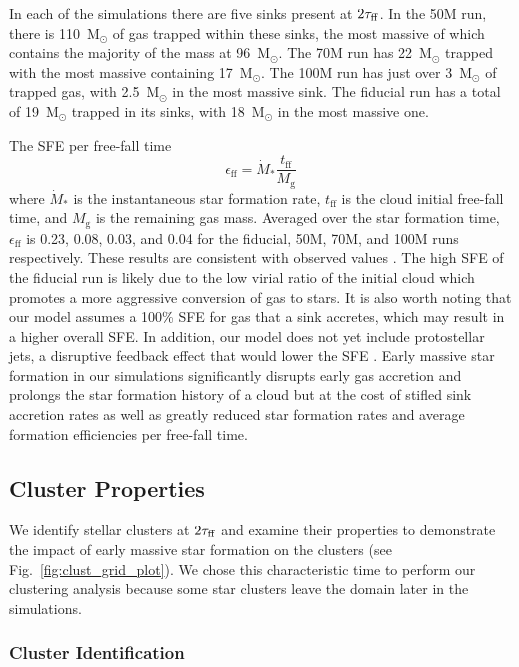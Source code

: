 \documentclass[twoside]{drexel-thesis}
\begin{document}
\begin{thesis}
In each of the simulations there are five sinks present at $2\tau_{\rm ff}$. In the 50M run, there is 110~M$_\odot$ of gas trapped within these sinks, the most massive of which contains the majority of the mass at 96~M$_\odot$. The 70M run has 22~M$_\odot$ trapped with the most massive containing 17~M$_\odot$. The 100M run has just over 3~M$_\odot$ of trapped gas, with 2.5~M$_\odot$ in the most massive sink. The fiducial run has a total of 19~M$_\odot$ trapped in its sinks, with 18~M$_\odot$ in the most massive one.  

The SFE per free-fall time
\begin{equation}\label{eqn:sfe}
\epsilon_{\text{ff}} = \dot{M}_{*}\frac{t_{\text{ff}}}{M_{\text{g}}}
\end{equation}
where $\dot{M}_*$ is the instantaneous star formation rate, $t_{\text{ff}}$ is the cloud initial free-fall time, and  $M_{\text{g}}$ is the remaining gas mass. Averaged over the star formation time,  $\epsilon_{\text{ff}}$ is 0.23, 0.08, 0.03, and 0.04 for the fiducial, 50M, 70M, and 100M runs respectively. These results are consistent with observed values \cite[as collected and reported by][]{krumholz_star_2019}. The high SFE of the fiducial run is likely due to the low virial ratio of the initial cloud which promotes a more aggressive conversion of gas to stars. It is also worth noting that our model assumes a 100\% SFE for gas that a sink accretes, which may result in a higher overall SFE. In addition, our model does not yet include protostellar jets, a disruptive feedback effect that would lower the SFE \citep{federrath_inefficient_2015,appel_effects_2022}. Early massive star formation in our simulations significantly disrupts early gas accretion and prolongs the star formation history of a cloud but at the cost of stifled sink accretion rates as well as greatly reduced star formation rates and average formation efficiencies per free-fall time.
\subsection{Cluster Properties}  \label{sec:Hierarchical} 
We identify stellar clusters at $2 \tau_{\rm ff}$ and examine their properties to demonstrate the impact of early massive star formation on the clusters (see Fig.~\ref{fig:clust_grid_plot}). We chose this characteristic time to perform our clustering analysis because some star clusters leave the domain later in the simulations.

\subsubsection{Cluster Identification}


\end{thesis}
\end{document}
